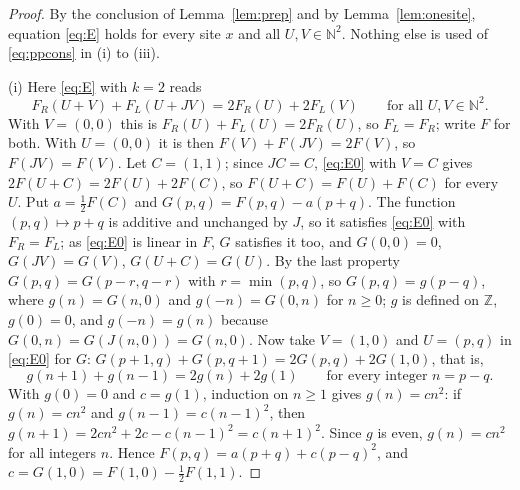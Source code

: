 \begin{proof}
By the conclusion of Lemma~\ref{lem:prep} and by Lemma~\ref{lem:onesite}, equation \eqref{eq:E} holds for every site $x$ and all $U,V\in\mathbb{N}^2$. Nothing else is used of \eqref{eq:ppcons} in (i) to (iii).

(i) Here \eqref{eq:E} with $k=2$ reads
\begin{equation}\label{eq:E0}
F_R(U+V)+F_L(U+JV)=2F_R(U)+2F_L(V)\qquad\text{for all }U,V\in\mathbb{N}^2 .
\end{equation}
With $V=(0,0)$ this is $F_R(U)+F_L(U)=2F_R(U)$, so $F_L=F_R$; write $F$ for both. With $U=(0,0)$ it is then $F(V)+F(JV)=2F(V)$, so $F(JV)=F(V)$. Let $C=(1,1)$; since $JC=C$, \eqref{eq:E0} with $V=C$ gives $2F(U+C)=2F(U)+2F(C)$, so $F(U+C)=F(U)+F(C)$ for every $U$. Put $a=\tfrac12F(C)$ and $G(p,q)=F(p,q)-a(p+q)$. The function $(p,q)\mapsto p+q$ is additive and unchanged by $J$, so it satisfies \eqref{eq:E0} with $F_R=F_L$; as \eqref{eq:E0} is linear in $F$, $G$ satisfies it too, and $G(0,0)=0$, $G(JV)=G(V)$, $G(U+C)=G(U)$. By the last property $G(p,q)=G(p-r,q-r)$ with $r=\min(p,q)$, so $G(p,q)=g(p-q)$, where $g(n)=G(n,0)$ and $g(-n)=G(0,n)$ for $n\ge0$; $g$ is defined on $\mathbb{Z}$, $g(0)=0$, and $g(-n)=g(n)$ because $G(0,n)=G(J(n,0))=G(n,0)$. Now take $V=(1,0)$ and $U=(p,q)$ in \eqref{eq:E0} for $G$: $G(p+1,q)+G(p,q+1)=2G(p,q)+2G(1,0)$, that is,
\[
g(n+1)+g(n-1)=2g(n)+2g(1)\qquad\text{for every integer }n=p-q .
\]
With $g(0)=0$ and $c=g(1)$, induction on $n\ge1$ gives $g(n)=cn^2$: if $g(n)=cn^2$ and $g(n-1)=c(n-1)^2$, then $g(n+1)=2cn^2+2c-c(n-1)^2=c(n+1)^2$. Since $g$ is even, $g(n)=cn^2$ for all integers $n$. Hence $F(p,q)=a(p+q)+c(p-q)^2$, and $c=G(1,0)=F(1,0)-\tfrac12F(1,1)$.


\end{proof}
